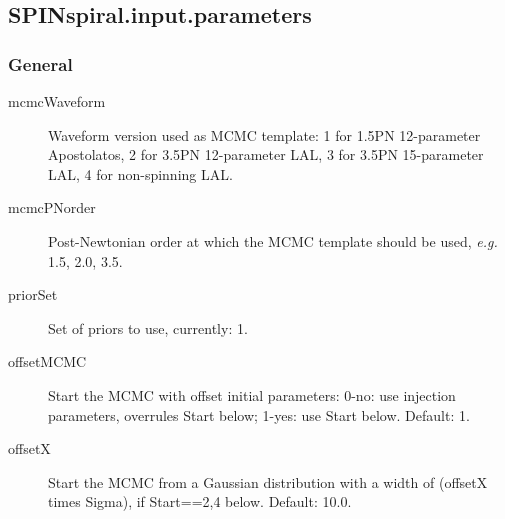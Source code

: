    






\pagebreak

\subsection{SPINspiral.input.parameters}


\subsubsection{General}
\begin{description}                
\item[mcmcWaveform] Waveform version used as MCMC template:  1 for 1.5PN 12-parameter Apostolatos, 2 for 3.5PN 12-parameter LAL, 3 for 3.5PN 15-parameter LAL, 4 for non-spinning LAL.
\item[mcmcPNorder] Post-Newtonian order at which the MCMC template should be used, \textit{e.g.} 1.5, 2.0, 3.5.
\item[priorSet] Set of priors to use, currently: 1.
\item[offsetMCMC] Start the MCMC with offset initial parameters: 0-no: use injection parameters, overrules Start below; 1-yes: use Start below.  Default: 1.
\item[offsetX] Start the MCMC from a Gaussian distribution with a width of (offsetX times Sigma), if Start==2,4 below.  Default: 10.0.
\end{description}                





